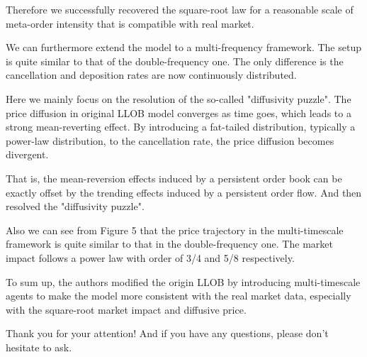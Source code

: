 \documentclass{article}
\begin{document}
Therefore we successfully recovered the square-root law for a reasonable scale of meta-order intensity that is compatible with real market. \newline

We can furthermore extend the model to a multi-frequency framework. The setup is quite similar to that of the double-frequency one. The only difference is the cancellation and deposition rates are now continuously distributed. \newline

Here we mainly focus on the resolution of the so-called "diffusivity puzzle". The price diffusion in original LLOB model converges as time goes, which leads to a strong mean-reverting effect. By introducing a fat-tailed distribution, typically a power-law distribution, to the cancellation rate, the price diffusion becomes divergent. \newline

That is, the mean-reversion effects induced by a persistent order book can be exactly offset by the trending effects induced by a persistent order flow. And then resolved the "diffusivity puzzle". \newline

Also we can see from Figure 5 that the price trajectory in the multi-timescale framework is quite similar to that in the double-frequency one. The market impact follows a power law with order of 3/4 and 5/8 respectively. \newline

To sum up, the authors modified the origin LLOB by introducing multi-timescale agents to make the model more consistent with the real market data, especially with the square-root market impact and diffusive price. \newline

Thank you for your attention! And if you have any questions, please don't hesitate to ask. \newline
\end{document}
